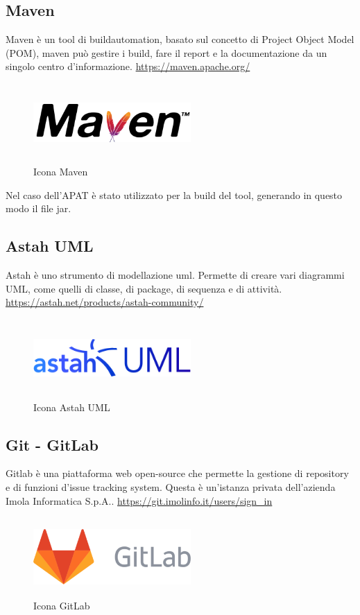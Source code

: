 \subsection*{Maven}
Maven è un tool di \gls{buildautomation}, basato sul concetto di Project Object Model (POM), maven può gestire i build, fare il report e la documentazione da un singolo centro d'informazione.
\url{https://maven.apache.org/}
\begin{figure}[H]
    \centering
    \includegraphics[width=6cm, height=3cm]{./immagini/maven.png}
    \caption{Icona Maven}\label{fig:maven}
\end{figure}
Nel caso dell'APAT è stato utilizzato per la build del tool, generando in questo modo il file jar.

\subsection*{Astah UML}
Astah è uno strumento di modellazione \gls{uml}. Permette di creare vari diagrammi UML, come quelli di classe, di package, di sequenza e di attività.
\url{https://astah.net/products/astah-community/}
\begin{figure}[H]
    \centering
    \includegraphics[width=6cm, height=3cm]{./immagini/astah.png}
    \caption{Icona Astah UML}\label{fig:astah}
\end{figure}

\subsection*{Git - GitLab}
Gitlab è una piattaforma web open-source che permette la gestione di repository e di funzioni d'issue tracking system.
Questa è un'istanza privata dell'azienda Imola Informatica S.p.A..
\url{https://git.imolinfo.it/users/sign_in}
\begin{figure}[H]
    \centering
    \includegraphics[width=6cm, height=3cm]{./immagini/gitlab.png}
    \caption{Icona GitLab}\label{fig:gitlab}
\end{figure}
